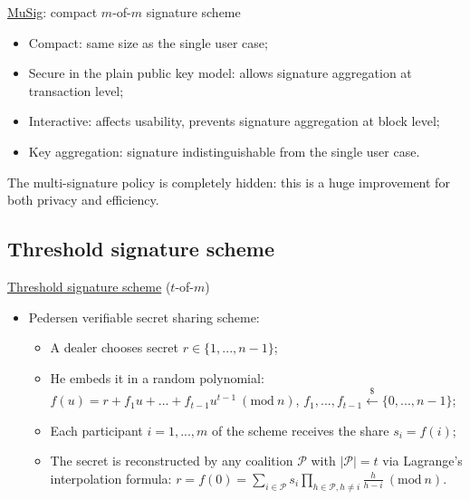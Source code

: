 \documentclass[slidescentered]{beamer}
\begin{document}
	\begin{frame}{\hyperlink{musig}{MuSig}: compact $m$-of-$m$ signature scheme}
		\begin{itemize}
			\item Compact: same size as the single user case;
			\item Secure in the plain public key model: allows signature aggregation at transaction level;
			\item Interactive: affects usability, prevents signature aggregation at block level;
			\item Key aggregation: signature indistinguishable from the single user case.
		\end{itemize}
		The multi-signature policy is completely hidden: this is a huge improvement for both privacy and efficiency.
	\end{frame}
	

	\subsection{Threshold signature scheme}
	\begin{frame}{\hyperlink{threshold}{Threshold signature scheme} ($t$-of-$m$)}
		\begin{itemize}
			\item Pedersen verifiable secret sharing scheme:
			\begin{itemize}
				\item A dealer chooses secret $r \in \{1, ..., n - 1\}$;
				\item He embeds it in a random polynomial:
				$f(u) = r + f_1u + ... + f_{t - 1}u^{t - 1} \ (\text{mod} \ n)$, $f_1, ..., f_{t - 1}\xleftarrow{\text{\$}} \{0, ..., n - 1\}$;
				\item Each participant $i = 1, ..., m$ of the scheme receives the share $s_i = f(i)$;
				\item The secret is reconstructed by any coalition $\mathcal{P}$ with $|\mathcal{P}| = t$ via Lagrange's interpolation formula: $r = f(0) = \sum_{i \in \mathcal{P}}s_i\prod_{h \in \mathcal{P}, h \neq i}\frac{h}{h - i} \ (\text{mod} \ n)$.
			\end{itemize}
		\end{itemize}
	\end{frame}
\end{document}
